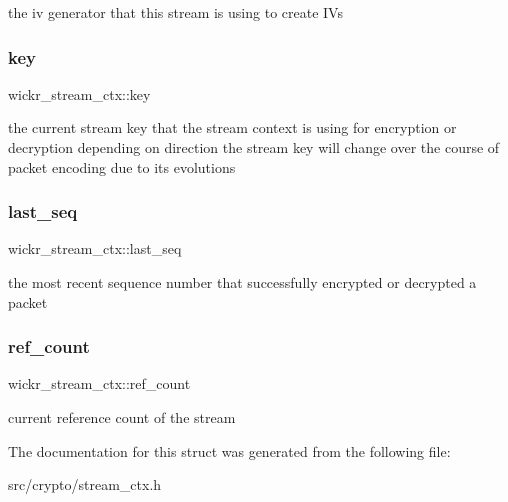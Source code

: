 the iv generator that this stream is using to create I\+Vs \mbox{\label{structwickr__stream__ctx_a3598b3c0415d13fafab6633f8c00a3c8}} 
\subsubsection{\texorpdfstring{key}{key}}
{\footnotesize\ttfamily wickr\+\_\+stream\+\_\+ctx\+::key}

the current stream key that the stream context is using for encryption or decryption depending on direction the stream key will change over the course of packet encoding due to it\textquotesingle{}s evolutions \mbox{\label{structwickr__stream__ctx_abf2c6ab54e1663e6a47e310fd68b3b3f}} 
\subsubsection{\texorpdfstring{last\+\_\+seq}{last\_seq}}
{\footnotesize\ttfamily wickr\+\_\+stream\+\_\+ctx\+::last\+\_\+seq}

the most recent sequence number that successfully encrypted or decrypted a packet \mbox{\label{structwickr__stream__ctx_aa0e74b2c117666501373a5947d92e8c4}} 
\subsubsection{\texorpdfstring{ref\+\_\+count}{ref\_count}}
{\footnotesize\ttfamily wickr\+\_\+stream\+\_\+ctx\+::ref\+\_\+count}

current reference count of the stream 

The documentation for this struct was generated from the following file\+:\begin{DoxyCompactItemize}
\item 
src/crypto/stream\+\_\+ctx.\+h\end{DoxyCompactItemize}

